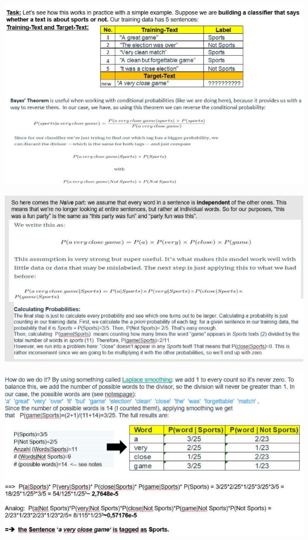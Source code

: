 \documentclass[12pt]{article}
\begin{document}
\begin{center}  
\hspace*{-2.8cm} 
\includegraphics{Bayes-Beispiel01}
\end{center}

\begin{center}  
\hspace*{-2.5cm} 
\includegraphics{Bayes-Beispiel02}
\end{center}\begin{center}  

\hspace*{-1.8cm} 
\includegraphics{Bayes-Beispiel03}
\end{center}
\end{document}
